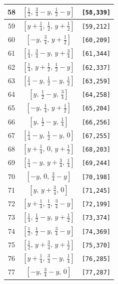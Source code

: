 \documentclass[fleqn,8pt]{jsarticle}
\begin{document}
\begin{longtable}{ccc}
58 & $\left[ \frac{1}{2},\, \frac{3}{4} - y,\, \frac{1}{2} - y \right]$ & {\tt [58,339]} \\ \hline
59 & $\left[ y + \frac{1}{4},\, \frac{1}{2},\, y + \frac{1}{2} \right]$ & {\tt [59,212]} \\ \hline
60 & $\left[ - y,\, \frac{3}{4},\, y + \frac{1}{2} \right]$ & {\tt [60,209]} \\ \hline
61 & $\left[ \frac{1}{4},\, \frac{3}{4} - y,\, y + \frac{3}{4} \right]$ & {\tt [61,344]} \\ \hline
62 & $\left[ \frac{1}{4},\, y + \frac{1}{2},\, \frac{1}{2} - y \right]$ & {\tt [62,337]} \\ \hline
63 & $\left[ \frac{1}{4} - y,\, \frac{1}{2} - y,\, \frac{1}{2} \right]$ & {\tt [63,259]} \\ \hline
64 & $\left[ y,\, \frac{1}{2} - y,\, \frac{3}{4} \right]$ & {\tt [64,258]} \\ \hline
65 & $\left[ - y,\, \frac{1}{4},\, y + \frac{1}{2} \right]$ & {\tt [65,204]} \\ \hline
66 & $\left[ y,\, \frac{1}{2} - y,\, \frac{1}{4} \right]$ & {\tt [66,256]} \\ \hline
67 & $\left[ \frac{1}{4} - y,\, \frac{1}{2} - y,\, 0 \right]$ & {\tt [67,255]} \\ \hline
68 & $\left[ y + \frac{1}{4},\, 0,\, y + \frac{1}{2} \right]$ & {\tt [68,203]} \\ \hline
69 & $\left[ \frac{1}{4} - y,\, y + \frac{3}{4},\, \frac{1}{4} \right]$ & {\tt [69,244]} \\ \hline
70 & $\left[ - y,\, 0,\, \frac{3}{4} - y \right]$ & {\tt [70,198]} \\ \hline
71 & $\left[ y,\, y + \frac{3}{4},\, 0 \right]$ & {\tt [71,245]} \\ \hline
72 & $\left[ y + \frac{1}{4},\, \frac{1}{4},\, \frac{3}{4} - y \right]$ & {\tt [72,199]} \\ \hline
73 & $\left[ \frac{1}{4},\, \frac{1}{2} - y,\, y + \frac{1}{2} \right]$ & {\tt [73,374]} \\ \hline
74 & $\left[ \frac{1}{2},\, \frac{1}{2} - y,\, \frac{3}{4} - y \right]$ & {\tt [74,369]} \\ \hline
75 & $\left[ \frac{1}{2},\, y + \frac{3}{4},\, y + \frac{1}{2} \right]$ & {\tt [75,370]} \\ \hline
76 & $\left[ y + \frac{1}{4},\, \frac{3}{4} - y,\, \frac{1}{4} \right]$ & {\tt [76,285]} \\ \hline
77 & $\left[ - y,\, \frac{3}{4} - y,\, 0 \right]$ & {\tt [77,287]} \\ \hline

\end{longtable}
\end{document}
